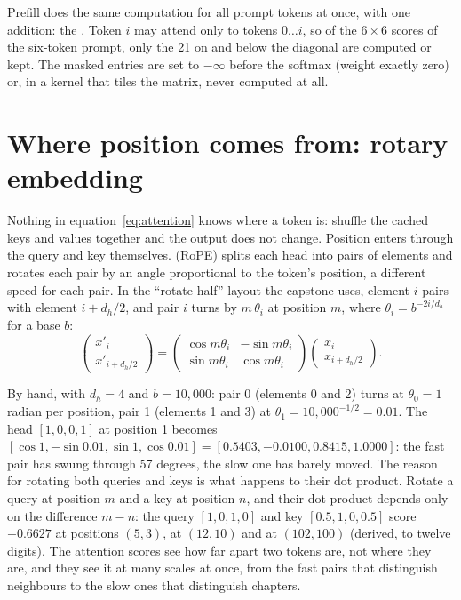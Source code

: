 Prefill does the same computation for all prompt tokens at once, with one
addition: the . Token $i$ may attend only to tokens
$0 \ldots i$, so of the $6 \times 6$ scores of the six-token prompt, only the
21 on and below the diagonal are computed or kept. The masked entries are set
to $-\infty$ before the softmax (weight exactly zero) or, in a kernel that
tiles the matrix, never computed at all.

\section{Where position comes from: rotary embedding}

Nothing in equation~\eqref{eq:attention} knows where a token is: shuffle the
cached keys and values together and the output does not change. Position
enters through the query and key themselves. 
(RoPE) \cite{su2021roformer} splits each head into pairs of elements and
rotates each pair by an angle proportional to the token's position, a
different speed for each pair. In the ``rotate-half'' layout the capstone uses,
element $i$ pairs with element $i + d_h/2$, and pair $i$ turns by
$m\,\theta_i$ at position $m$, where $\theta_i = b^{-2i/d_h}$ for a base $b$:
\begin{equation}
\begin{pmatrix} x'_i \\ x'_{i+d_h/2} \end{pmatrix} =
\begin{pmatrix} \cos m\theta_i & -\sin m\theta_i \\ \sin m\theta_i & \cos m\theta_i \end{pmatrix}
\begin{pmatrix} x_i \\ x_{i+d_h/2} \end{pmatrix}.
\label{eq:rope}
\end{equation}

By hand, with $d_h = 4$ and $b = 10{,}000$: pair 0 (elements 0 and 2) turns at
$\theta_0 = 1$ radian per position, pair 1 (elements 1 and 3) at
$\theta_1 = 10{,}000^{-1/2} = 0.01$. The head $[1, 0, 0, 1]$ at position 1
becomes $[\cos 1, -\sin 0.01, \sin 1, \cos 0.01] = [0.5403, -0.0100, 0.8415,
1.0000]$: the fast pair has swung through 57 degrees, the slow one has barely
moved. The reason for rotating both queries and keys is what happens to their
dot product. Rotate a query at position $m$ and a key at position $n$, and
their dot product depends only on the difference $m - n$: the query
$[1, 0, 1, 0]$ and key $[0.5, 1, 0, 0.5]$ score $-0.6627$ at positions
$(5, 3)$, at $(12, 10)$ and at $(102, 100)$ (derived, to twelve digits). The
attention scores see how far apart two tokens are, not where they are, and they
see it at many scales at once, from the fast pairs that distinguish neighbours
to the slow ones that distinguish chapters.

